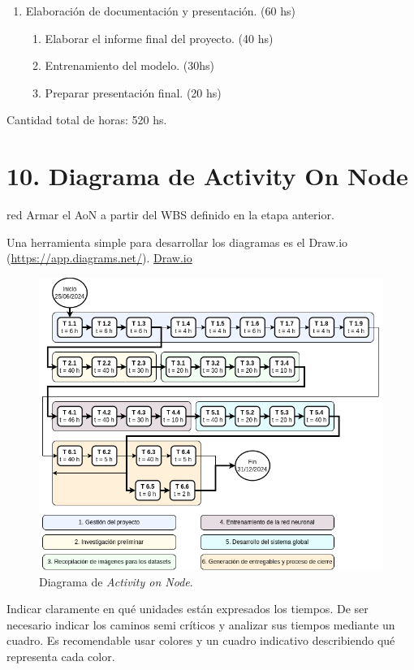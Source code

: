 \documentclass[
11pt %
]{charter}
\begin{document}
\begin{enumerate}
\item Elaboración de documentación y presentación. (60 hs)
	\begin{enumerate}
	\item Elaborar el informe final del proyecto. (40 hs)
	\item Entrenamiento del modelo. (30hs)
	\item Preparar presentación final. (20 hs)
	\end{enumerate}
\end{enumerate}

Cantidad total de horas: 520 hs.

\section{10. Diagrama de Activity On Node}
\label{sec:AoN}

\begin{consigna}{red}
Armar el AoN a partir del WBS definido en la etapa anterior.

Una herramienta simple para desarrollar los diagramas es el Draw.io (\url{https://app.diagrams.net/}).
\href{https://app.diagrams.net}{Draw.io}


\begin{figure}[htpb]
\centering 
\includegraphics[width=.8\textwidth]{./Figuras/AoN.png}
\caption{Diagrama de \textit{Activity on Node}.}
\label{fig:AoN}
\end{figure}

Indicar claramente en qué unidades están expresados los tiempos.
De ser necesario indicar los caminos semi críticos y analizar sus tiempos mediante un cuadro.
Es recomendable usar colores y un cuadro indicativo describiendo qué representa cada color.

\end{consigna}
\end{document}
